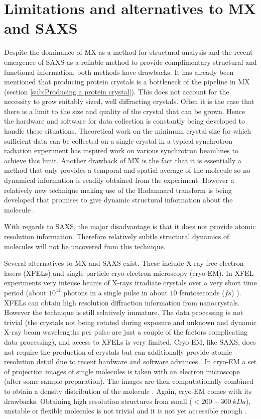 \section{Limitations and alternatives to MX and SAXS}
\label{sec:Limitations and alternatives to MX and SAXS}
    Despite the dominance of MX as a method for structural analysis and the recent emergence of SAXS as a reliable method to provide complimentary structural and functional information, both methods have drawbacks.
    It has already been mentioned that producing protein crystals is a bottleneck of the pipeline in MX (section \ref{sub:Producing a protein crystal}).
    This does not account for the necessity to grow suitably sized, well diffracting crystals. Often it is the case that there is a limit to the size and quality of the crystal that can be grown.
    Hence the hardware and software for data collection is constantly being developed to handle these situations.
    Theoretical work on the minimum crystal size for which sufficient data can be collected on a single crystal in a typical synchrotron radiation experiment \cite{holton2010} has inspired work on various synchrotron beamlines to achieve this limit.
    Another drawback of MX is the fact that it is essentially a method that only provides a temporal and spatial average of the molecule so no dynamical information is readily obtained from the experiment.
    However a relatively new technique making use of the Hadamaard transform is being developed that promises to give dynamic structural information about the molecule \cite{yorke2014time}.

    With regards to SAXS, the major disadvantage is that it does not provide atomic resolution information. Therefore relatively subtle structural dynamics of molecules will not be uncovered from this technique.

    Several alternatives to MX and SAXS exist. These include X-ray free electron lasers (XFELs) and single particle cryo-electron microscopy (cryo-EM).
    In XFEL experiments very intense beams of X-rays irradiate crystals over a very short time period (about $10^{12}$ photons in a single pulse in about $10$ femtoseconds ($fs$) \cite{chapman2011femtosecond}). XFELs can obtain high resolution diffraction information from nanocrystals.
    However the technique is still relatively immature. The data processing is not trivial (the crystals not being rotated during exposure and unknown and dynamic X-ray beam wavelengths per pulse are just a couple of the factors complicating data processing), and access to XFELs is very limited.
    Cryo-EM, like SAXS, does not require the production of crystals but can additionally provide atomic resolution detail due to recent hardware and software advances \cite{bai2015cryo}.
    In cryo-EM a set of projection images of single molecules is taken with an electron microscope (after some sample preparation). The images are then computationally combined to obtain a density distribution of the molecule \cite{milne2013cryo}.
    Again, cryo-EM comes with its drawbacks. Obtaining high resolution structures from small ($< 200-300\ kDa$), unstable or flexible molecules is not trivial and it is not yet accessible enough \cite{bai2015cryo}.

